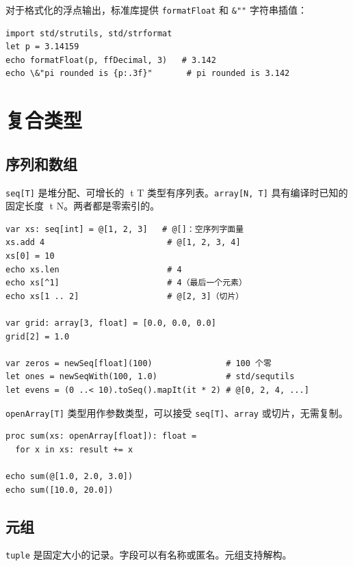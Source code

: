 \documentclass[justified, sixbynine]{tufte-book}
\def\ft{\small\tt}
\theoremstyle{plain}%
\newtheorem * {corollary}{推论}
\theoremstyle{definition}
\theoremstyle{remark}
\newtheorem * {remark}{注记}
\newtheorem * {note}{注释}
\begin{document}
\begin{fullwidth}
对于格式化的浮点输出，标准库提供 {\ft formatFloat} 和 {\ft \&""} 字符串插值：

\begin{lstlisting}
import std/strutils, std/strformat
let p = 3.14159
echo formatFloat(p, ffDecimal, 3)   # 3.142
echo \&"pi rounded is {p:.3f}"       # pi rounded is 3.142
\end{lstlisting}

\goodbreak\section{复合类型}

\goodbreak\subsection{序列和数组}


{\ft seq[T]} 是堆分配、可增长的 {t T} 类型有序列表。{\ft array[N, T]} 具有编译时已知的固定长度 {t N}。两者都是零索引的。

\begin{lstlisting}
var xs: seq[int] = @[1, 2, 3]   # @[]：空序列字面量
xs.add 4                         # @[1, 2, 3, 4]
xs[0] = 10
echo xs.len                      # 4
echo xs[^1]                      # 4（最后一个元素）
echo xs[1 .. 2]                  # @[2, 3]（切片）

var grid: array[3, float] = [0.0, 0.0, 0.0]
grid[2] = 1.0

var zeros = newSeq[float](100)               # 100 个零
let ones = newSeqWith(100, 1.0)              # std/sequtils
let evens = (0 ..< 10).toSeq().mapIt(it * 2) # @[0, 2, 4, ...]
\end{lstlisting}

{\ft openArray[T]} 类型用作参数类型，可以接受 {\ft seq[T]}、{\ft array} 或切片，无需复制。

\begin{lstlisting}
proc sum(xs: openArray[float]): float =
  for x in xs: result += x

echo sum(@[1.0, 2.0, 3.0])
echo sum([10.0, 20.0])
\end{lstlisting}

\goodbreak\subsection{元组}


{\ft tuple} 是固定大小的记录。字段可以有名称或匿名。元组支持解构。


\end{fullwidth}
\end{document}
